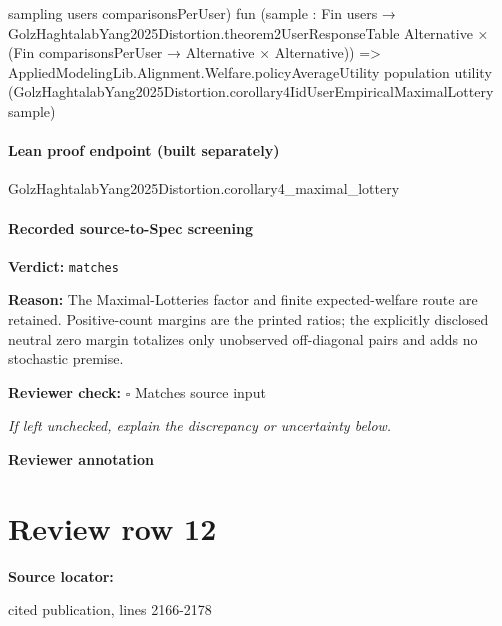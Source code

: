 \documentclass[10pt]{article}
\newcommand{\reviewerbox}{%
  \par\noindent\fbox{\parbox{0.96\linewidth}{\rule{0pt}{0.38in}}}\par
}
\newcommand{\reviewmatch}[1]{%
  \par\noindent\textbf{Reviewer check:} $\square$\; #1\par
  \noindent\emph{If left unchecked, explain the discrepancy or uncertainty below.}\par
}
\begin{document}
\begin{ReviewVerbatim}
                                                sampling users comparisonsPerUser)
                                              fun
                                                (sample :
                                                  Fin users →
                                                    GolzHaghtalabYang2025Distortion.theorem2UserResponseTable
                                                        Alternative ×
                                                      (Fin comparisonsPerUser → Alternative × Alternative)) =>
                                              AppliedModelingLib.Alignment.Welfare.policyAverageUtility population
                                                utility
                                                (GolzHaghtalabYang2025Distortion.corollary4IidUserEmpiricalMaximalLottery
                                                  sample)
\end{ReviewVerbatim}

\paragraph{Lean proof endpoint (built separately)}\begin{ReviewVerbatim}
GolzHaghtalabYang2025Distortion.corollary4_maximal_lottery
\end{ReviewVerbatim}

\paragraph{Recorded source-to-Spec screening}
\textbf{Verdict:} \texttt{matches}
\\
{\raggedright
\textbf{Reason:} The Maximal-\allowbreak{}Lotteries factor and finite expected-\allowbreak{}welfare route are retained.\allowbreak{} Positive-\allowbreak{}count margins are the printed ratios;\allowbreak{} the explicitly disclosed neutral zero margin totalizes only unobserved off-\allowbreak{}diagonal pairs and adds no stochastic premise.\allowbreak{}
\par}
\reviewmatch{Matches source input}
\noindent\textbf{Reviewer annotation}\par
\reviewerbox
\clearpage
\hypertarget{source-claim-9824dd64b1ddd3ad}{}
\section*{Review row 12}
\textbf{Source locator:} {\footnotesize\raggedright cited publication, lines 2166-\allowbreak{}2178\par}
\end{document}
